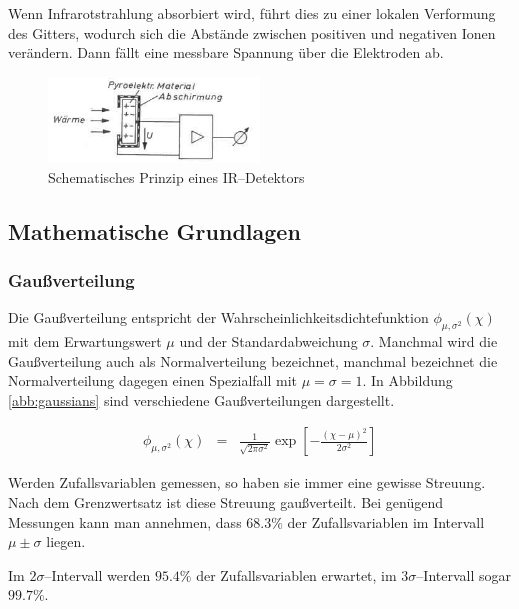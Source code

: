 \documentclass[12pt,a4paper]{scrartcl}
\numberwithin{equation}{section} %
\begin{document}
Wenn Infrarotstrahlung absorbiert wird, führt dies zu einer lokalen Verformung des Gitters, wodurch sich die Abstände zwischen positiven und negativen Ionen verändern. Dann fällt eine messbare Spannung über die Elektroden ab.

\begin{figure}[h!]
	\centering
	\includegraphics[width=0.5\textwidth]{../media/B1.1/IR_Sensor.jpg}
	\caption{Schematisches Prinzip eines IR--Detektors \cite{pyroelektrischer Sensor}}
	\label{abb:pyroelektrischer Sensor}
\end{figure}

\hypertarget{mathematische-grundlagen}{%
\subsection{Mathematische Grundlagen}\label{mathematische-grundlagen}}

\hypertarget{gauuxdfverteilung}{%
\subsubsection{Gaußverteilung}\label{gauuxdfverteilung}}

Die Gaußverteilung entspricht der Wahrscheinlichkeitsdichtefunktion $\phi_{\mu,\sigma^2}(\chi)$ mit dem Erwartungswert $\mu$ und der Standardabweichung $\sigma$. Manchmal wird die Gaußverteilung auch als Normalverteilung bezeichnet, manchmal bezeichnet die Normalverteilung dagegen einen Spezialfall mit $\mu=\sigma=1$. In Abbildung \ref{abb:gaussians} sind verschiedene Gaußverteilungen dargestellt.

\begin{eqnarray}
    \phi_{\mu,\sigma^2}(\chi) &=&
        \frac{1}{\sqrt{2\pi\sigma^2}}
        \exp\left[
            -
            \frac{(\chi - \mu)^2}{2\sigma^2}
        \right]
\end{eqnarray}

\noindent
Werden Zufallsvariablen gemessen, so haben sie immer eine gewisse Streuung. Nach dem Grenzwertsatz ist diese Streuung gaußverteilt. Bei genügend Messungen kann man annehmen, dass $68.3\%$ der Zufallsvariablen im Intervall $\mu\pm\sigma$ liegen.

Im $2\sigma$--Intervall werden $95.4\%$ der Zufallsvariablen erwartet, im $3\sigma$--Intervall sogar $99.7\%$.
\end{document}
